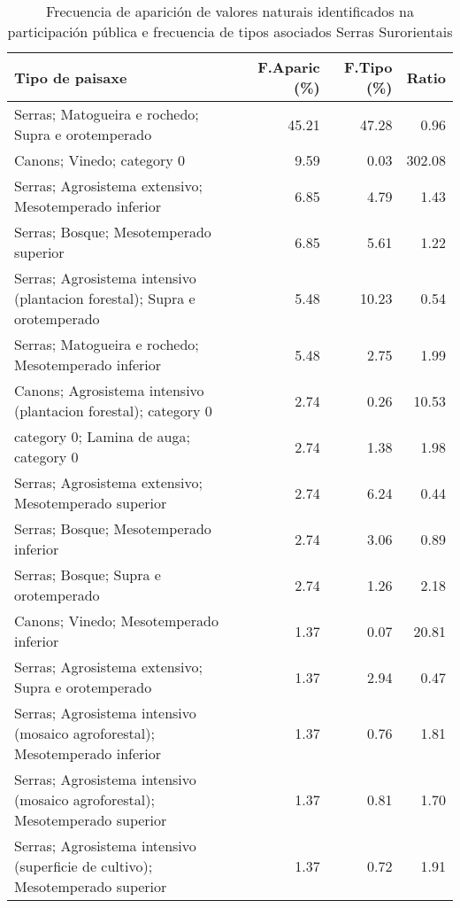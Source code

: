 \begin{table}[p]
\centering
\caption{Frecuencia de aparición de valores naturais identificados na participación pública e frecuencia de tipos asociados Serras Surorientais} 
\label{vsixotnat9}
\begin{tabular}{lrrr}
  \hline
Tipo de paisaxe & F.Aparic (\%) & F.Tipo (\%) & Ratio \\ 
  \hline
Serras; Matogueira e rochedo; Supra e orotemperado & 45.21 & 47.28 & 0.96 \\ 
  Canons; Vinedo; category 0 & 9.59 & 0.03 & 302.08 \\ 
  Serras; Agrosistema extensivo; Mesotemperado inferior & 6.85 & 4.79 & 1.43 \\ 
  Serras; Bosque; Mesotemperado superior & 6.85 & 5.61 & 1.22 \\ 
  Serras; Agrosistema intensivo (plantacion forestal); Supra e orotemperado & 5.48 & 10.23 & 0.54 \\ 
  Serras; Matogueira e rochedo; Mesotemperado inferior & 5.48 & 2.75 & 1.99 \\ 
  Canons; Agrosistema intensivo (plantacion forestal); category 0 & 2.74 & 0.26 & 10.53 \\ 
  category 0; Lamina de auga; category 0 & 2.74 & 1.38 & 1.98 \\ 
  Serras; Agrosistema extensivo; Mesotemperado superior & 2.74 & 6.24 & 0.44 \\ 
  Serras; Bosque; Mesotemperado inferior & 2.74 & 3.06 & 0.89 \\ 
  Serras; Bosque; Supra e orotemperado & 2.74 & 1.26 & 2.18 \\ 
  Canons; Vinedo; Mesotemperado inferior & 1.37 & 0.07 & 20.81 \\ 
  Serras; Agrosistema extensivo; Supra e orotemperado & 1.37 & 2.94 & 0.47 \\ 
  Serras; Agrosistema intensivo (mosaico agroforestal); Mesotemperado inferior & 1.37 & 0.76 & 1.81 \\ 
  Serras; Agrosistema intensivo (mosaico agroforestal); Mesotemperado superior & 1.37 & 0.81 & 1.70 \\ 
  Serras; Agrosistema intensivo (superficie de cultivo); Mesotemperado superior & 1.37 & 0.72 & 1.91 \\ 
   \hline
\end{tabular}
\end{table}
